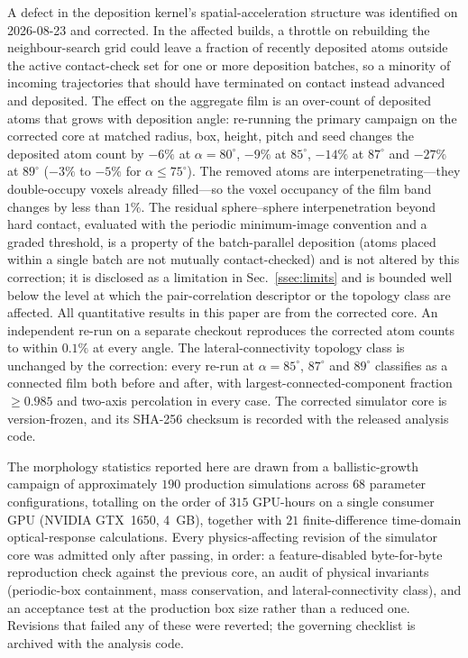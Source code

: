\documentclass[aip,amsmath,amssymb,reprint]{revtex4-1}
\newcommand{\dang}{\ensuremath{\alpha}}
\begin{document}
A defect in the deposition kernel's spatial-acceleration structure was
identified on 2026-08-23 and corrected. In the affected builds, a throttle
on rebuilding the neighbour-search grid could leave a fraction of recently
deposited atoms outside the active contact-check set for one or more
deposition batches, so a minority of incoming trajectories that should have
terminated on contact instead advanced and deposited. The effect on the
aggregate film is an over-count of deposited atoms that grows with
deposition angle: re-running the primary campaign on the corrected core at
matched radius, box, height, pitch and seed changes the deposited atom
count by $-6\%$ at $\dang = 80^{\circ}$, $-9\%$ at $85^{\circ}$, $-14\%$
at $87^{\circ}$ and $-27\%$ at $89^{\circ}$ ($-3\%$ to $-5\%$ for
$\dang \le 75^{\circ}$). The removed atoms are interpenetrating---they
double-occupy voxels already filled---so the voxel occupancy of the film
band changes by less than $1\%$.
The residual sphere--sphere interpenetration beyond hard contact,
evaluated with the periodic minimum-image convention and a graded
threshold, is a property of the batch-parallel deposition (atoms placed
within a single batch are not mutually contact-checked) and is not
altered by this correction; it is disclosed as a limitation in
Sec.~\ref{ssec:limits} and is bounded well below the level at which
the pair-correlation descriptor or the topology class are affected.
All quantitative results in this paper are from the corrected core. An
independent re-run on a separate checkout reproduces the corrected atom
counts to within $0.1\%$ at every angle. The lateral-connectivity topology
class is unchanged by the correction: every re-run at $\dang = 85^{\circ}$,
$87^{\circ}$ and $89^{\circ}$ classifies as a connected film both before
and after, with largest-connected-component fraction $\ge 0.985$ and
two-axis percolation in every case. The corrected simulator core is
version-frozen, and its SHA-256 checksum is recorded with the released
analysis code.

The morphology statistics reported here are drawn from a ballistic-growth
campaign of approximately $190$ production simulations across $68$
parameter configurations, totalling on the order of $315$ GPU-hours on a
single consumer GPU (NVIDIA GTX~1650, \SI{4}{GB}), together with $21$
finite-difference time-domain optical-response calculations. Every
physics-affecting revision of the simulator core was admitted only after
passing, in order: a feature-disabled byte-for-byte reproduction check
against the previous core, an audit of physical invariants (periodic-box
containment, mass conservation, and lateral-connectivity class), and an
acceptance test at the production box size rather than a reduced one.
Revisions that failed any of these were reverted; the governing checklist
is archived with the analysis code.
\end{document}

